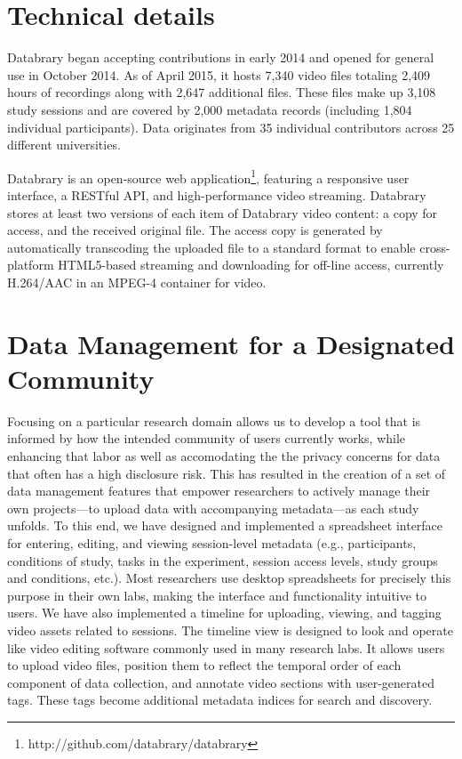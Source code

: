 \documentclass{sig-alternate}
\begin{document}
\section{Technical details}

Databrary began accepting contributions in early 2014 and opened for general use in October 2014.
As of April 2015, it hosts 7,340 video files totaling 2,409 hours of recordings along with 2,647 additional files.
These files make up 3,108 study sessions and are covered by 2,000 metadata records (including 1,804 individual participants).
Data originates from 35 individual contributors across 25 different universities.

Databrary is an open-source web application\footnote{http://github.com/databrary/databrary}, featuring a responsive user interface, a RESTful API, and high-performance video streaming.
Databrary stores at least two versions of each item of Databrary video content: a copy for access, and the received original file.
The access copy is generated by automatically transcoding the uploaded file to a standard format to enable cross-platform HTML5-based streaming and downloading for off-line access, currently H.264/AAC in an MPEG-4 container for video.

\section{Data Management for a Designated Community}

Focusing on a particular research domain allows us to develop a tool that is informed by how the intended community of users currently works, while enhancing that labor as well as accomodating the the privacy concerns for data that often has a high disclosure risk.
This has resulted in the creation of a set of data management features that empower researchers to actively manage their own projects---to upload data with accompanying metadata---as each study unfolds. 
To this end, we have designed and implemented a spreadsheet interface for entering, editing, and viewing session-level metadata (e.g., participants, conditions of study, tasks in the experiment, session access levels, study groups and conditions, etc.). 
Most researchers use desktop spreadsheets for precisely this purpose in their own labs, making the interface and functionality intuitive to users. 
We have also implemented a timeline for uploading, viewing, and tagging video assets related to sessions.
The timeline view is designed to look and operate like video editing software commonly used in many research labs.
It allows users to upload video files, position them to reflect the temporal order of each component of data collection, and annotate video sections with user-generated tags. 
These tags become additional metadata indices for search and discovery.
\end{document}
